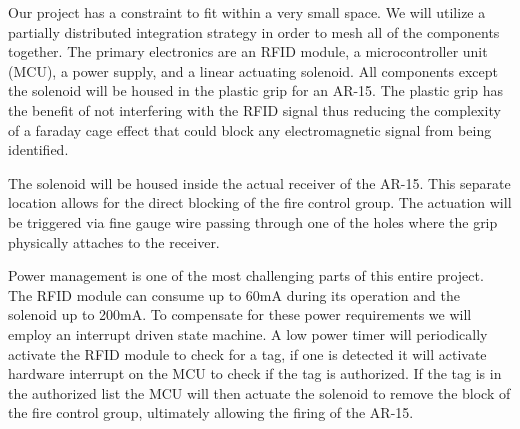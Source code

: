 Our project has a constraint to fit within a very small space. We will utilize a partially
distributed integration strategy in order to mesh all of the components together. 
The primary electronics are an RFID module, a microcontroller unit (MCU), a power supply,
and a linear actuating solenoid. All components except the solenoid will be housed in the 
plastic grip for an AR-15. The plastic grip has the benefit of not interfering with the
RFID signal thus reducing the complexity of a faraday cage effect that could block any 
electromagnetic signal from being identified. 


The solenoid will be housed inside the actual receiver of the AR-15. This separate 
location allows for the direct blocking of the fire control group. The actuation will be 
triggered via fine gauge wire passing through one of the holes where the grip physically 
attaches to the receiver. 


Power management is one of the most challenging parts of this entire project. The RFID 
module can consume up to 60mA during its operation and the solenoid up to 200mA. To 
compensate for these power requirements we will employ an interrupt driven state machine. 
A low power timer will  periodically activate the RFID module to check for a tag, if one 
is detected it will activate hardware interrupt on the MCU to check if the tag is 
authorized. If the tag is in the authorized list the MCU will then actuate the solenoid 
to remove the block of the fire control group, ultimately allowing the firing of the AR-15.